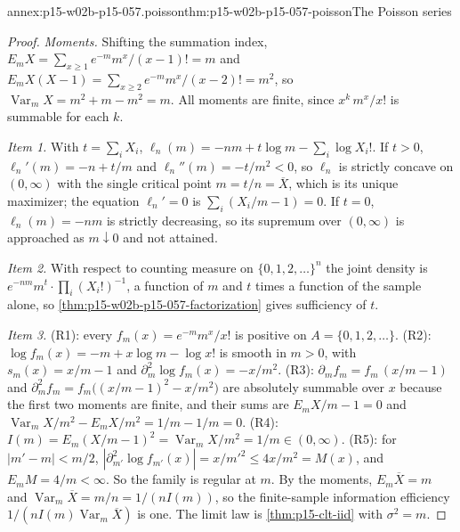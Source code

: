 \begin{annexitem}{annex:p15-w02b-p15-057.poisson}{thm:p15-w02b-p15-057-poisson}{The Poisson series}
\begin{proof}
\emph{Moments.} Shifting the summation index,
\(E_mX=\sum_{x\geq1}e^{-m}m^x/(x-1)!=m\) and
\(E_mX(X-1)=\sum_{x\geq2}e^{-m}m^x/(x-2)!=m^2\), so
\(\operatorname{Var}_mX=m^2+m-m^2=m\). All moments are finite, since
\(x^k\,m^x/x!\) is summable for each \(k\).

\emph{Item 1.} With \(t=\sum_iX_i\),
\(\ell_n(m)=-nm+t\log m-\sum_i\log X_i!\). If \(t>0\),
\(\ell_n'(m)=-n+t/m\) and \(\ell_n''(m)=-t/m^2<0\), so \(\ell_n\) is
strictly concave on \((0,\infty)\) with the single critical point
\(m=t/n=\overline X\), which is its unique maximizer; the equation
\(\ell_n'=0\) is \(\sum_i(X_i/m-1)=0\). If \(t=0\),
\(\ell_n(m)=-nm\) is strictly decreasing, so its supremum over
\((0,\infty)\) is approached as \(m\downarrow0\) and not attained.

\emph{Item 2.} With respect to counting measure on
\(\{0,1,2,\ldots\}^n\) the joint density is
\(e^{-nm}m^{t}\cdot\prod_i(X_i!)^{-1}\), a function of \(m\) and \(t\)
times a function of the sample alone, so
\cref{thm:p15-w02b-p15-057-factorization} gives sufficiency of \(t\).

\emph{Item 3.} (R1): every \(f_m(x)=e^{-m}m^x/x!\) is positive on
\(A=\{0,1,2,\ldots\}\). (R2): \(\log f_m(x)=-m+x\log m-\log x!\) is smooth
in \(m>0\), with \(s_m(x)=x/m-1\) and \(\partial_m^2\log f_m(x)=-x/m^2\).
(R3): \(\partial_mf_m=f_m\,(x/m-1)\) and
\(\partial_m^2f_m=f_m\bigl((x/m-1)^2-x/m^2\bigr)\) are absolutely summable
over \(x\) because the first two moments are finite, and their sums are
\(E_mX/m-1=0\) and \(\operatorname{Var}_mX/m^2-E_mX/m^2=1/m-1/m=0\).
(R4): \(I(m)=E_m(X/m-1)^2=\operatorname{Var}_mX/m^2=1/m\in(0,\infty)\).
(R5): for \(|m'-m|<m/2\), \(|\partial_{m'}^2\log f_{m'}(x)|=x/m'^2\leq
4x/m^2=M(x)\), and \(E_mM=4/m<\infty\). So the family is regular at \(m\).
By the moments, \(E_m\overline X=m\) and
\(\operatorname{Var}_m\overline X=m/n=1/(nI(m))\), so the finite-sample
information efficiency \(1/(nI(m)\operatorname{Var}_m\overline X)\) is one.
The limit law is \cref{thm:p15-clt-iid} with \(\sigma^2=m\).
\end{proof}
\end{annexitem}

